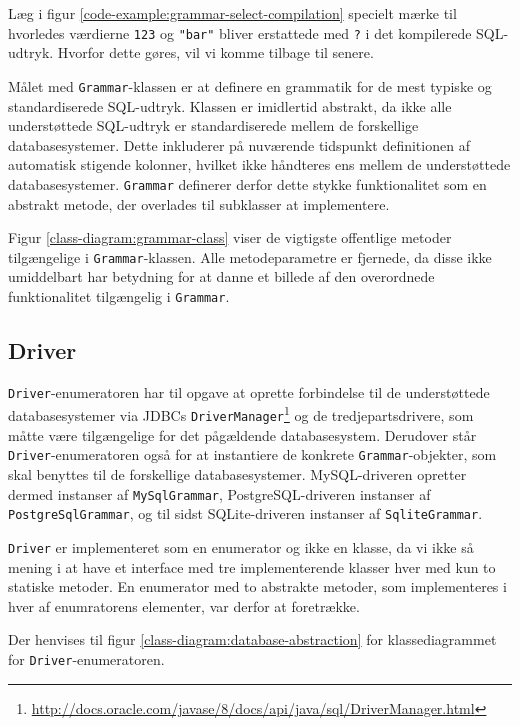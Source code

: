 Læg i figur \ref{code-example:grammar-select-compilation} specielt mærke til hvorledes værdierne \texttt{123} og \texttt{"bar"} bliver erstattede med \texttt{?} i det kompilerede SQL-udtryk. Hvorfor dette gøres, vil vi komme tilbage til senere.

Målet med \texttt{Grammar}-klassen er at definere en grammatik for de mest typiske og standardiserede SQL-udtryk. Klassen er imidlertid abstrakt, da ikke alle understøttede SQL-udtryk er standardiserede mellem de forskellige databasesystemer. Dette inkluderer på nuværende tidspunkt definitionen af automatisk stigende kolonner, hvilket ikke håndteres ens mellem de understøttede databasesystemer. \texttt{Grammar} definerer derfor dette stykke funktionalitet som en abstrakt metode, der overlades til subklasser at implementere.

Figur \ref{class-diagram:grammar-class} viser de vigtigste offentlige metoder tilgængelige i \texttt{Grammar}-klassen. Alle metodeparametre er fjernede, da disse ikke umiddelbart har betydning for at danne et billede af den overordnede funktionalitet tilgængelig i \texttt{Grammar}.

\subsection{Driver}

\texttt{Driver}-enumeratoren har til opgave at oprette forbindelse til de understøttede databasesystemer via JDBCs \texttt{Driver\-Manager}\footnote{\url{http://docs.oracle.com/javase/8/docs/api/java/sql/DriverManager.html}} og de tredjepartsdrivere, som måtte være tilgængelige for det pågældende databasesystem. Derudover står \texttt{Driver}-enumeratoren også for at instantiere de konkrete \texttt{Grammar}-objekter, som skal benyttes til de forskellige databasesystemer. MySQL-driveren opretter dermed instanser af \texttt{MySql\-Grammar}, PostgreSQL-driveren instanser af \texttt{PostgreSql\-Grammar}, og til sidst SQLite-driveren instanser af \texttt{Sqlite\-Grammar}.

\texttt{Driver} er implementeret som en enumerator og ikke en klasse, da vi ikke så mening i at have et interface med tre implementerende klasser hver med kun to statiske metoder. En enumerator med to abstrakte metoder, som implementeres i hver af enumratorens elementer, var derfor at foretrække.

Der henvises til figur \ref{class-diagram:database-abstraction} for klassediagrammet for \texttt{Driver}-enumeratoren.

